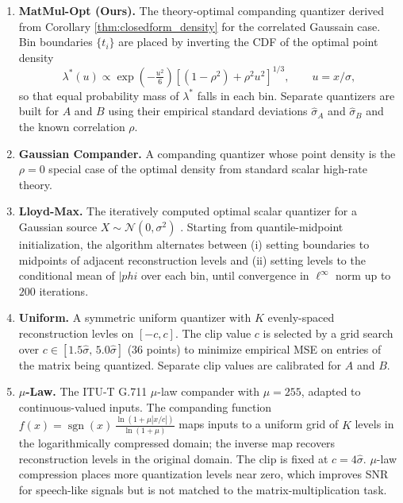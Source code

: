 \documentclass{article}
\begin{document}
\begin{enumerate}
    \item \textbf{MatMul-Opt (Ours).}
    The theory-optimal companding quantizer derived from Corollary \ref{thm:closedform_density} for the correlated Gaussain case.
    Bin boundaries $\{t_i\}$ are placed by inverting the CDF of the optimal point density
    \begin{equation}
        \lambda^*(u) \propto
        \exp\!\left(-\tfrac{u^2}{6}\right)
        \left[(1-\rho^2) + \rho^2 u^2\right]^{1/3},
        \qquad u = x/\sigma,
    \end{equation}
    so that equal probability mass of $\lambda^*$ falls in each bin. 
    Separate quantizers are built for $A$ and $B$ using their empirical standard deviations $\hat\sigma_A$ and $\hat\sigma_B$ and the known correlation $\rho$.
    \item \textbf{Gaussian Compander.}
    A companding quantizer whose point density is the $\rho = 0$ special case of the optimal density from standard scalar high-rate theory.
    \item \textbf{Lloyd-Max.}
    The iteratively computed optimal scalar quantizer for a Gaussian source $X \sim \mathcal{N}(0,\sigma^2)$ \cite{lloyd1982least}. Starting from quantile-midpoint initialization, the algorithm alternates between (i) setting boundaries to midpoints of adjacent reconstruction levels and (ii) setting levels to the conditional mean of $|phi$ over each bin, until convergence in $\ell^\infty$ norm up to $200$ iterations.
    \item \textbf{Uniform.}
    A symmetric uniform quantizer with $K$ evenly-spaced reconstruction levles on $[-c,c]$. The clip value $c$ is selected by a grid search over $c \in [1.5\hat\sigma,\, 5.0 \hat\sigma]$ (36 points) to minimize empirical MSE on entries of the matrix being quantized. Separate clip values are calibrated for $A$ and $B$.
    \item \textbf{$\mu$-Law.}
    The ITU-T G.711 $\mu$-law compander \cite{jayant1984digital} with $\mu = 255$, adapted to continuous-valued inputs. 
    The companding function $f(x) = \operatorname{sgn}(x)\,
    \tfrac{\ln(1+\mu|x/c|)}{\ln(1+\mu)}$ maps inputs to a uniform grid of $K$
    levels in the logarithmically compressed domain; the inverse map recovers
    reconstruction levels in the original domain.
    The clip is fixed at $c = 4\hat\sigma$.
    $\mu$-law compression places more quantization levels near zero, which
    improves SNR for speech-like signals but is not matched to the
    matrix-multiplication task.

\end{enumerate}
\end{document}
